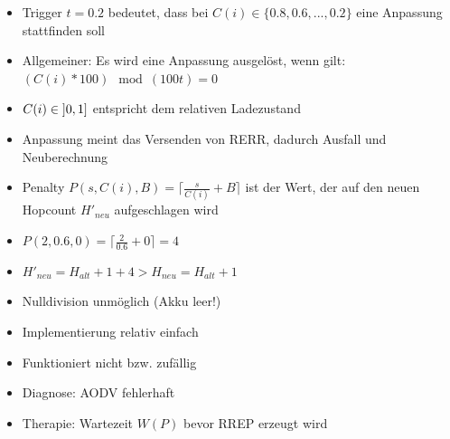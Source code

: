\documentclass[11pt,landscape]{beamer}
\begin{document}
\begin{frame}{\insertsubsection}
\begin{itemize}
\item Trigger $t = 0.2$ bedeutet, dass bei $C(i) \in \{0.8,0.6,...,0.2\}$ eine Anpassung stattfinden soll\newline
\item Allgemeiner: Es wird eine Anpassung ausgelöst, wenn gilt: \newline $(C(i) * 100) \mod(100t) = 0$\newline
\item $C(i) \in \interval[open left]{0}{1}$ entspricht dem relativen Ladezustand\newline
\item Anpassung meint das Versenden von RERR, dadurch Ausfall und Neuberechnung
\end{itemize}
\end{frame}


\begin{frame}{\insertsubsection}
\begin{itemize}
\item Penalty $P(s,C(i),B) = \lceil\frac{s}{C(i)} + B\rceil$ ist der Wert, der auf den neuen Hopcount $H'_{neu}$ aufgeschlagen wird\newline
\item $P(2,0.6,0) = \lceil\frac{2}{0.6} + 0\rceil = 4$\newline
\item $H'_{neu} = H_{alt} + 1 + 4 > H_{neu} = H_{alt} + 1$\newline
\item Nulldivision unmöglich (Akku leer!)
\end{itemize}
\end{frame}

\begin{frame}{\insertsubsection}
\begin{itemize}
\item Implementierung relativ einfach\newline
\item Funktioniert nicht bzw. zufällig\newline
\item Diagnose: AODV fehlerhaft\newline
\item Therapie: Wartezeit $W(P)$ bevor RREP erzeugt wird
\end{itemize}
\end{frame}
\end{document}
